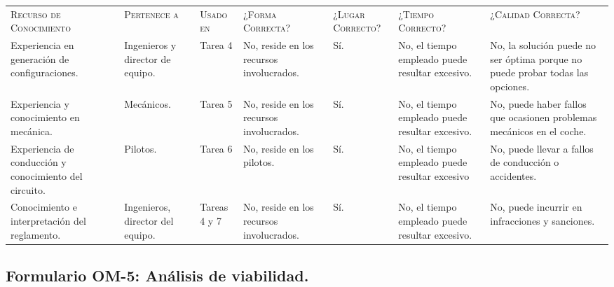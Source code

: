 \documentclass[12pt,a4paper,twoside,spanish]{article}      %
\newcommand{\PreserveBackslash}[1]{\let\temp=\\#1\let\\=\temp}
\let\PBS=\PreserveBackslash
\begin{document}
\begin{table}[H]
\scriptsize
\begin{tabularx}{\textwidth}{|>{\raggedright}X|>{\raggedright}X|>{\raggedright}X|>{\raggedright}X|>{\raggedright}X|>{\raggedright}X|>{\PBS\raggedright}X|} \hline
\multicolumn{3}{|l}{\textbf{Modelo de Organización}} & \multicolumn{4}{|l|}{\textbf{Formulario OM-4: Activos de Conocimiento}} \\ \hline\hline
\textsc{Recurso de Conocimiento} & \textsc{Pertenece a} &  \textsc{Usado en} &  \textsc{¿Forma
Correcta?} & \textsc{¿Lugar Correcto?} & \textsc{¿Tiempo Correcto?} & \textsc{¿Calidad Correcta?}\\ \hline

Experiencia en generación de configuraciones. & 
Ingenieros y director de equipo. &
Tarea 4 & 
No, reside en los recursos involucrados. & 
Sí. &
No, el tiempo empleado puede resultar excesivo. & 
No, la solución puede no ser óptima porque no puede probar todas las opciones.\\ \hline

Experiencia y conocimiento en mecánica. & 
Mecánicos. &
Tarea 5 & 
No, reside en los recursos involucrados. & 
Sí. &
No, el tiempo empleado puede resultar excesivo. & 
No, puede haber fallos que ocasionen problemas mecánicos en el coche.\\ \hline

Experiencia de conducción y conocimiento del circuito. & 
Pilotos. &
Tarea 6 & 
No, reside en los pilotos. & 
Sí. &
No, el tiempo empleado puede resultar excesivo & 
No, puede llevar a fallos de conducción o accidentes.\\ \hline

Conocimiento e interpretación del reglamento. & 
Ingenieros, director del equipo. &
Tareas 4 y 7 & 
No, reside en los recursos involucrados. & 
Sí. &
No, el tiempo empleado puede resultar excesivo. & 
No, puede incurrir en infracciones y sanciones.\\ \hline

\end{tabularx}
  \label{tab.OM4}
\end{table}

\pagebreak
\subsection{Formulario OM-5: Análisis de viabilidad.}
\end{document}
